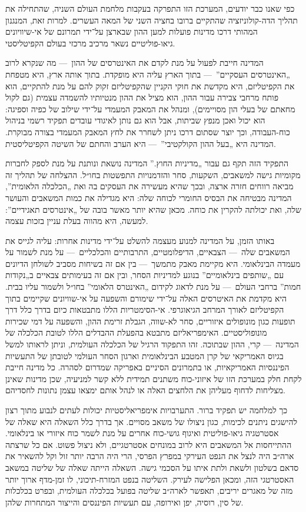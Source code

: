 כפי שאנו כבר יודעים, המערכת הזו התפרקה בעקבות מלחמת העולם השניה, שהתחילה את תהליך הדה-קולוניזציה שהתקיים ברובו בחציה השני של המאה העשרים. למרות זאת, המנגנון המהותי דרכו מדינות פועלות למען ההון שבארצן על־ידי  תמרונם של אי-שיוויונים גיאו-פוליטיים נשאר מרכיב מרכזי בעולם הקפיטליסטי.

המדינה חייבת לפעול על מנת לקדם את האינטרסים של ההון~— מה שנקרא לרוב „האינטרסים העסקיים”~— בתוך הארץ עליה היא מופקדת. בתוך אותה ארץ, היא מטפחת את הקפיטליזם, היא מקדשת את חוקי הקניין שהקפיטליזם זקוק להם על מנת להתקיים, הוא פותח מרחבי צבירה עבור ההון, הוא מציל את ההון מנטיותיו להשמדה עצמית (גם לקול מחאתם של בעלי הון מסויימים), ומנהל את המאבק המעמדי על־ידי שילוב של כפיה וספיגה: הוא יכול ואכן מנפץ שביתות, אבל הוא גם נותן לאיגודי עובדים תפקיד רשמי בניהול כוח-העבודה, וכך יוצר שסתום דרכו ניתן לשחרר את לחץ המאבק המעמדי בצורה מבוקרת. המדינה היא „בעל ההון הקולקטיבי”~— היא הערב והחתם של השיטה הקפיטליסטית.

התפקיד הזה תקף גם עבור „מדיניות החוץ.” המדינה נושאת ונותנת על מנת לספק לחברות מקומיות גישה למשאבים, השקעות, סחר והזדמנויות התפשטות בחו״ל. ההצלחה של תהליך זה מביאה רווחים חזרה ארצה, ובכך שהיא מעשירה את העסקים בה ואת „הכלכלה הלאומית”, המדינה מבטיחה את הבסיס החומרי לכוחה שלה: היא מגדילה את כמות המשאבים והעושר שלה, ואת יכולתה להקרין את כוחה. מכאן שהיא יותר מאשר בובה של „אינטרסים תאגידיים”: למעשה, היא מהווה בעלת עניין בזכות עצמה.

באותו הזמן, על המדינה למנוע מעצמה להשלט על־ידי מדינות אחרות: עליה לגייס את המשאבים שלה~— הצבאיים, הדיפלומטיים, התרבותיים והכלכליים~— על מנת לשמור על מעמדה הבינלאומי. היא מקיימת מאבק מתמשך~— בין אם זה בשיחות מסביב לשולחן הדיונים עם „שותפים בינלאומיים” בנוגע למדיניות הסחר, ובין אם זה בעימותים צבאיים ב„נקודות חמות” ברחבי העולם~— על מנת לדאוג לקידום „האינטרס הלאומי” בחו״ל ולשמור עליו בבית. היא מקדמת את האיטרסים האלה על־ידי שימורם והשפעה על אי-שוויונים שקיימים בתוך הקפיטליזם לאורך המרחב הגיאוגרפי. אי-הסימטריות הללו מתבטאות כיום בדרך כלל דרך תופעות כגון מונופולים איזוריים, סחר לא-שווה, הגבלת זרימת ההון, והשפעה על דמי שכירות מונופוליסטיים. האימפריאליזם מתבטא בהפעלת ההבדלים הללו לטובת הכלכלה של המדינה~— קרי, ההון שבתוכה. זהו התפקוד הרגיל של הכלכלה העולמית, וניתן לראותו למשל בגיוס האמריקאי של קרן המטבע הבינלאומית וארגון הסחר העולמי לטובתן של התעשיות הפיננסיות האמריקאיות, או בתמרונים הסיניים באפריקה שמדרום לסהרה. כל מדינה חייבת לקחת חלק במערכת הזו של איזוני-כוח משתנים תמידית ללא  קשר למניעיה, שכן מדינות שאינן מצליחות לדחוף מעליהן את הלחצים האלה או לנהל אותם ימצאו עצמן נתונות לחסדיהם.

כך למלחמה יש תפקיד ברור. התערבויות אימפריאליסטיות יכולות לעתים לנבוע מתוך רצון להישגים ניתנים לכימות, כגון ניצולו של משאב מסויים. אך בדרך כלל השאלה היא שאלה של אסטרטגיה גיאו-פוליטית ואיגוף גושי-כוח אחרים על מנת לשמר כוח איזורי או בינלאומי. ההתייחסות אל המשאבים היא לרוב במונחים אסטרטגיים, ולא ניצול פשוט. אם כל שרצתה ארה״ב היה לנצל את הנפט העירקי במפרץ הפרסי, הרי היה הרבה יותר זול וקל להשאיר את סדאם בשלטון ולשאת ולתת איתו על הסכמי גישה. השאלה הייתה שאלה של שליטה במשאב האסטרטגי הזה, ומכאן הפלישה לעירק. השליטה בנפט המזרח-תיכוני, לו זמן-מדף ארוך יותר מזה של מאגרים יריבים, תאפשר לארה״ב שליטה בפועל בכלכלה העולמית, ובפרט בכלכלות של סין, רוסיה, יפן ואירופה, עם תעשיות הפיננסים והייצור המתחרות שלהן.

